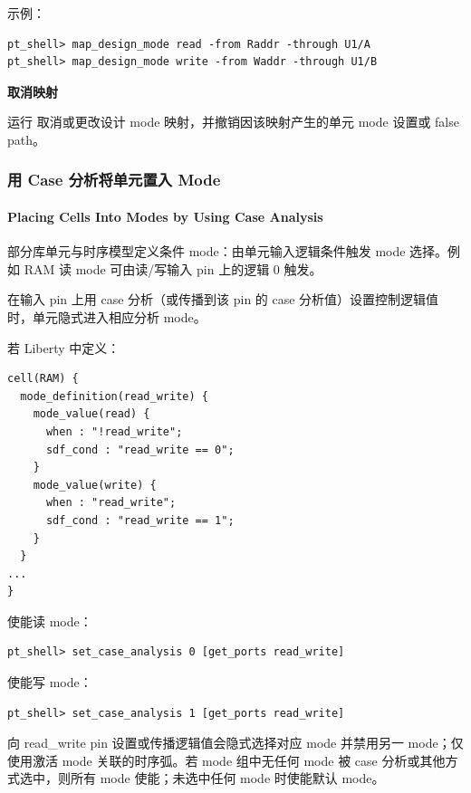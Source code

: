 示例：
\begin{lstlisting}
pt_shell> map_design_mode read -from Raddr -through U1/A
pt_shell> map_design_mode write -from Waddr -through U1/B
\end{lstlisting}


\textbf{取消映射}

运行  取消或更改设计 mode 映射，并撤销因该映射产生的单元 mode 设置或 false path。

\subsubsection{用 Case 分析将单元置入 Mode}
\paragraph*{Placing Cells Into Modes by Using Case Analysis}

部分库单元与时序模型定义条件 mode：由单元输入逻辑条件触发 mode 选择。例如 RAM 读 mode 可由读/写输入 pin 上的逻辑 0 触发。

在输入 pin 上用 case 分析（或传播到该 pin 的 case 分析值）设置控制逻辑值时，单元隐式进入相应分析 mode。


若 Liberty 中定义：
\begin{lstlisting}
cell(RAM) {
  mode_definition(read_write) {
    mode_value(read) {
      when : "!read_write";
      sdf_cond : "read_write == 0";
    }
    mode_value(write) {
      when : "read_write";
      sdf_cond : "read_write == 1";
    }
  }
...
}
\end{lstlisting}

使能读 mode：
\begin{lstlisting}
pt_shell> set_case_analysis 0 [get_ports read_write]
\end{lstlisting}

使能写 mode：
\begin{lstlisting}
pt_shell> set_case_analysis 1 [get_ports read_write]
\end{lstlisting}

向 read\_write pin 设置或传播逻辑值会隐式选择对应 mode 并禁用另一 mode；仅使用激活 mode 关联的时序弧。若 mode 组中无任何 mode 被 case 分析或其他方式选中，则所有 mode 使能；未选中任何 mode 时使能默认 mode。

